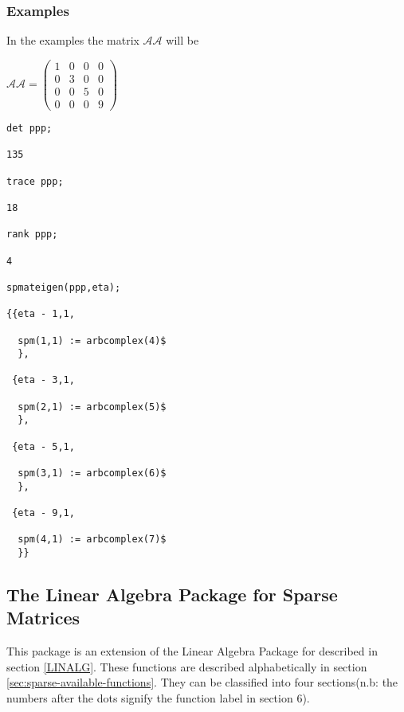 \subsubsection{Examples}
In the examples the matrix $\mathcal{AA}$ will be

\begin{flushleft}
\(
\mathcal{AA} = \left( \begin{array}{cccc} 1 & 0 & 0 & 0 \\ 0 & 3 & 0 & 0 \\
0 & 0 & 5 & 0 \\ 0 & 0 & 0 & 9
\end{array} \right)
\)
\end{flushleft}
\begin {verbatim}
det ppp;

135

trace ppp;

18

rank ppp;

4

spmateigen(ppp,eta);

{{eta - 1,1,

  spm(1,1) := arbcomplex(4)$
  },

 {eta - 3,1,

  spm(2,1) := arbcomplex(5)$
  },

 {eta - 5,1,

  spm(3,1) := arbcomplex(6)$
  },

 {eta - 9,1,

  spm(4,1) := arbcomplex(7)$
  }}
\end{verbatim}

\subsection{The Linear Algebra Package for Sparse Matrices}
This package is an extension of the Linear Algebra Package for \REDUCE{}
described in section \ref{LINALG}.
These functions are described
alphabetically in section \ref{sec:sparse-available-functions}.
They can be classified into four sections(n.b: the numbers after
the dots signify the function label in section 6).

